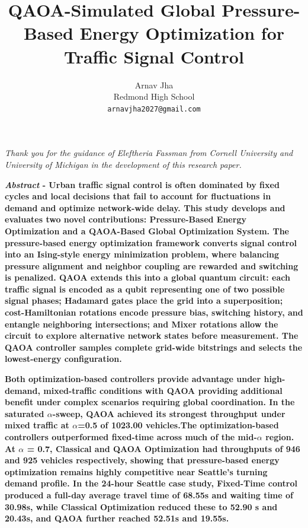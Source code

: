 \documentclass[12pt]{article}
\title{QAOA-Simulated Global Pressure-Based Energy Optimization for Traffic Signal Control}
\author{Arnav Jha \\ \small Redmond High School \\ \small \texttt{arnavjha2027@gmail.com}}
\date{}
\begin{document}

\maketitle

\noindent\textit{Thank you for the guidance of Eleftheria Fassman from Cornell University and University of Michigan in the development of this research paper.}

\textbf{\emph{Abstract} - 
    Urban traffic signal control is often dominated by fixed cycles and local decisions that fail to account for fluctuations in demand and optimize network-wide delay. This study develops and evaluates two novel contributions: Pressure-Based Energy Optimization and a QAOA-Based Global Optimization System. The pressure-based energy optimization framework converts signal control into an Ising-style energy minimization problem, where balancing pressure alignment and neighbor coupling are rewarded and switching is penalized. QAOA extends this into a global quantum circuit: each traffic signal is encoded as a qubit representing one of two possible signal phases; Hadamard gates place the grid into a superposition; cost-Hamiltonian rotations encode pressure bias, switching history, and entangle neighboring intersections; and Mixer rotations allow the circuit to explore alternative network states before measurement. The QAOA controller samples complete grid-wide bitstrings and selects the lowest-energy configuration. 
     }
    
\textbf{
    Both optimization-based controllers provide advantage under high-demand, mixed-traffic conditions with QAOA providing additional benefit under complex scenarios requiring global coordination. In the saturated $\alpha$-sweep, QAOA achieved its strongest throughput under mixed traffic at $\alpha$=0.5 of 1023.00 vehicles.The optimization-based controllers outperformed fixed-time across much of the mid-$\alpha$ region. At $\alpha$ = 0.7, Classical and QAOA Optimization had throughputs of 946 and 925 vehicles respectively, showing that pressure-based energy optimization remains highly competitive near Seattle’s turning demand profile. In the 24-hour Seattle case study, Fixed-Time control produced a full-day average travel time of 68.55s and waiting time of 30.98s, while Classical Optimization reduced these to 52.90 s and 20.43s, and QAOA further reached 52.51s and 19.55s.
}
    
\end{document}
